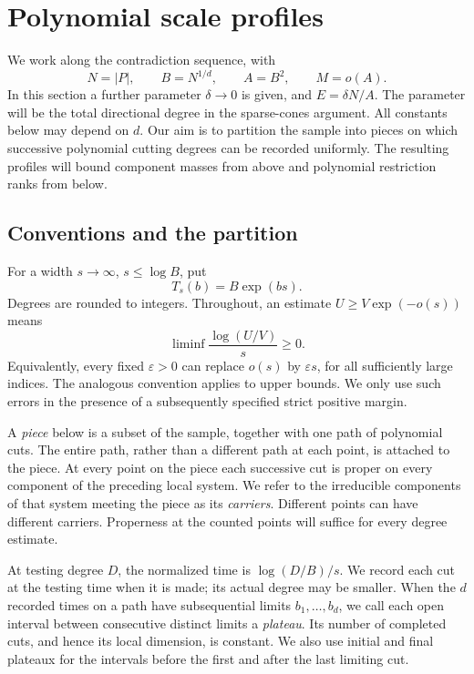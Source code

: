 \section{Polynomial scale profiles}\label{sec:profiles}

We work along the contradiction sequence, with
\[
 N=|P|,\qquad B=N^{1/d},\qquad A=B^2,\qquad M=o(A).
\]
In this section a further parameter $\delta\to0$ is given, and $E=\delta N/A$.  The parameter will be the total directional degree in the sparse-cones argument.  All constants below may depend on $d$. Our aim is to partition the sample into pieces on which successive polynomial cutting degrees can be recorded uniformly.  The resulting profiles will bound component masses from above and polynomial restriction ranks from below.

\subsection{Conventions and the partition}

For a width $s\to\infty$, $s\le\log B$, put
\begin{equation}\label{eq:prof-testing-degree}
 T_s(b)=B\exp(bs).
\end{equation}
Degrees are rounded to integers.  Throughout, an estimate $U\ge V\exp(-o(s))$ means
\[
 \liminf\frac{\log(U/V)}s\ge0.
\]
Equivalently, every fixed $\varepsilon>0$ can replace $o(s)$ by $\varepsilon s$, for all sufficiently large indices.  The analogous convention applies to upper bounds.  We only use such errors in the presence of a subsequently specified strict positive margin.

A \emph{piece} below is a subset of the sample, together with one path of polynomial cuts.  The entire path, rather than a different path at each point, is attached to the piece.  At every point on the piece each successive cut is proper on every component of the preceding local system.  We refer to the irreducible components of that system meeting the piece as its \emph{carriers}.  Different points can have different carriers.  Properness at the counted points will suffice for every degree estimate.

At testing degree $D$, the normalized time is $\log(D/B)/s$. We record each cut at the testing time when it is made; its actual degree may be smaller.  When the $d$ recorded times on a path have subsequential limits $b_1,\ldots,b_d$, we call each open interval between consecutive distinct limits a \emph{plateau}.  Its number of completed cuts, and hence its local dimension, is constant.  We also use initial and final plateaux for the intervals before the first and after the last limiting cut.

